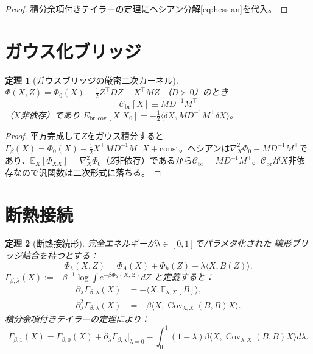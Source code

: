 \documentclass[12pt]{article}
\theoremstyle{plain}
\newtheorem{theorem}{定理}[section]
\theoremstyle{definition}
\numberwithin{equation}{section}
\newcommand{\br}{\mathrm{br}}
\DeclareMathOperator{\Cov}{Cov}
\begin{document}
\begin{proof}
積分余項付きテイラーの定理にヘシアン分解\eqref{eq:hessian}を代入。
\end{proof}


\section{ガウス化ブリッジ}\label{sec:gaussian}

\begin{theorem}[ガウスブリッジの厳密二次カーネル]\label{thm:gaussian}
$\Phi(X,Z)=\Phi_0(X)+\frac{1}{2}Z^\top DZ-X^\top MZ$
（$D\succ 0$）のとき
\begin{equation}
\boxed{\mathcal{C}_{\br}[X]\equiv MD^{-1}M^\top}
\end{equation}
（$X$非依存）であり
$E_{\br,\mathrm{cov}}[X|X_0]
=-\frac{1}{2}\langle\delta X,
MD^{-1}M^\top\delta X\rangle$。
\end{theorem}

\begin{proof}
平方完成して$Z$をガウス積分すると$\Gamma_\beta(X)=\Phi_0(X)-\frac{1}{2}X^\top MD^{-1}M^\top X+\mathrm{const}$。ヘシアンは$\nabla_X^2\Phi_0-MD^{-1}M^\top$であり、$\mathbb{E}_X[\Phi_{XX}]=\nabla_X^2\Phi_0$（$Z$非依存）であるから$\mathcal{C}_{\br}=MD^{-1}M^\top$。$\mathcal{C}_{\br}$が$X$非依存なので汎関数は二次形式に落ちる。
\end{proof}


\section{断熱接続}\label{sec:adiabatic}

\begin{theorem}[断熱接続形]\label{thm:adiabatic}
完全エネルギーが$\lambda\in[0,1]$でパラメタ化された
\emph{線形ブリッジ結合}を持つとする：
\begin{equation}
\Phi_\lambda(X,Z) = \Phi_A(X) + \Phi_h(Z)
- \lambda\langle X,B(Z)\rangle.
\end{equation}
$\Gamma_{\beta,\lambda}(X)
:=-\beta^{-1}\log\int e^{-\beta\Phi_\lambda(X,Z)}dZ$
と定義すると：
\begin{align}
\partial_\lambda\Gamma_{\beta,\lambda}(X)
&= -\langle X,\mathbb{E}_{\lambda,X}[B]\rangle,\\
\partial_\lambda^2\Gamma_{\beta,\lambda}(X)
&= -\beta\langle X,\Cov_{\lambda,X}(B,B)X\rangle.
\end{align}
積分余項付きテイラーの定理により：
\begin{equation}
\boxed{\Gamma_{\beta,1}(X)
= \Gamma_{\beta,0}(X)
+ \partial_\lambda\Gamma_{\beta,\lambda}|_{\lambda=0}
- \int_0^1(1-\lambda)\beta
\langle X,\Cov_{\lambda,X}(B,B)X\rangle d\lambda.}
\end{equation}
\end{theorem}
\end{document}
